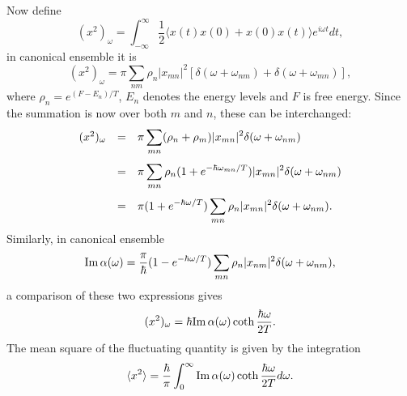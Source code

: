 \documentclass{book}
\newcommand{\average}[1]{\langle#1\rangle}
\renewcommand{\Im}{{\rm Im}}
\numberwithin{equation}{section}
\begin{document}
Now define 
\begin{equation}
  (x^2)_\omega=\int_{-\infty}^\infty\frac{1}{2}
  \average{x(t)x(0)+x(0)x(t)}e^{i\omega t}dt,
\end{equation}
in canonical ensemble it is
\begin{equation}
  (x^2)_\omega=\pi\sum_{nm}\rho_n|x_{mn}|^2
  [\delta(\omega+\omega_{nm})+\delta(\omega+\omega_{mn})],
\end{equation}
where $\rho_n=e^{(F-E_n)/T}$, $E_n$ denotes the energy levels and $F$
is free energy. Since the summation is now over both $m$ and $n$,
these can be interchanged:
\begin{equation}
  \begin{array}{rcl}
    (x^2)_\omega&=&\displaystyle\pi\sum_{mn}(\rho_n+\rho_m)|x_{mn}|^2
    \delta(\omega+\omega_{nm})\\\vbox to 18pt{}
    &=&\displaystyle\pi\sum_{mn}\rho_n(1+e^{-\hbar\omega_{mn}/T})|x_{mn}|^2
    \delta(\omega+\omega_{nm})\\\vbox to 18pt{}
    &=&\displaystyle\pi(1+e^{-\hbar\omega/T})\sum_{mn}\rho_n|x_{mn}|^2
    \delta(\omega+\omega_{nm}).
  \end{array}
\end{equation}
Similarly, in canonical ensemble
\begin{equation}
  \Im\,\alpha(\omega)=\frac{\pi}{\hbar}(1-e^{-\hbar\omega/T})
  \sum_{mn}\rho_n|x_{nm}|^2\delta(\omega+\omega_{nm}),
\end{equation}
a comparison of these two expressions gives
\begin{equation}
  (x^2)_\omega=\hbar\Im\,\alpha(\omega)\coth\frac{\hbar\omega}{2T}.
\end{equation}
The mean square of the fluctuating quantity is given by the
integration
\begin{equation}
  \average{x^2}=\frac{\hbar}{\pi}\int_0^\infty\Im\,\alpha(\omega)
  \coth\frac{\hbar\omega}{2T}d\omega.
\end{equation}
\end{document}
